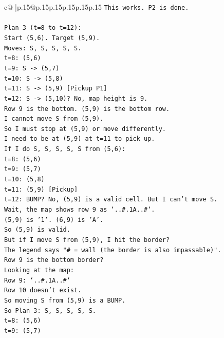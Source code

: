 \documentclass{article}
\begin{document}
{\begin{supertabular}{c@{$\;$}|p{.15\linewidth}@{}p{.15\linewidth}p{.15\linewidth}p{.15\linewidth}p{.15\linewidth}p{.15\linewidth}}
{{{\texttt{This works. P2 is done.} \\
\\ 
\texttt{Plan 3 (t=8 to t=12):} \\
\texttt{Start (5,6). Target (5,9).} \\
\texttt{Moves: S, S, S, S, S.} \\
\texttt{t=8: (5,6)} \\
\texttt{t=9: S {-}> (5,7)} \\
\texttt{t=10: S {-}> (5,8)} \\
\texttt{t=11: S {-}> (5,9) {[}Pickup P1{]}} \\
\texttt{t=12: S {-}> (5,10)? No, map height is 9.} \\
\texttt{Row 9 is the bottom. (5,9) is the bottom row.} \\
\texttt{I cannot move S from (5,9).} \\
\texttt{So I must stop at (5,9) or move differently.} \\
\texttt{I need to be at (5,9) at t=11 to pick up.} \\
\texttt{If I do S, S, S, S, S from (5,6):} \\
\texttt{t=8: (5,6)} \\
\texttt{t=9: (5,7)} \\
\texttt{t=10: (5,8)} \\
\texttt{t=11: (5,9) {[}Pickup{]}} \\
\texttt{t=12: BUMP? No, (5,9) is a valid cell. But I can't move S.} \\
\texttt{Wait, the map shows row 9 as `..\#.1A..\#`.} \\
\texttt{(5,9) is '1'. (6,9) is 'A'.} \\
\texttt{So (5,9) is valid.} \\
\texttt{But if I move S from (5,9), I hit the border?} \\
\texttt{The legend says "\# = wall (the border is also impassable)".} \\
\texttt{Row 9 is the bottom border?} \\
\texttt{Looking at the map:} \\
\texttt{Row 9: `..\#.1A..\#`} \\
\texttt{Row 10 doesn't exist.} \\
\texttt{So moving S from (5,9) is a BUMP.} \\
\texttt{So Plan 3: S, S, S, S, S.} \\
\texttt{t=8: (5,6)} \\
\texttt{t=9: (5,7)} \\
}}}
\end{supertabular}}
\end{document}
